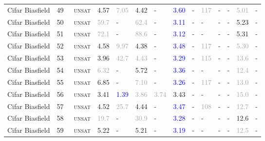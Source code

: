 \begin{center}
{\begin{longtable}{@{}llllllllllllll@{}}
Cifar Biasfield & 49 & ~\textsc{unsat} & \textcolor{second}{4.57} & \textcolor{darkgray}{7.05} & \textcolor{second}{4.42} & - & \textcolor{blue}{3.60} & - & \textcolor{darkgray}{117} & - & - & \textcolor{darkgray}{5.01} & - \\
Cifar Biasfield & 50 & ~\textsc{unsat} & \textcolor{darkgray}{59.7} & - & \textcolor{darkgray}{62.4} & - & \textcolor{blue}{3.11} & - & - & - & - & \textcolor{second}{5.23} & - \\
Cifar Biasfield & 51 & ~\textsc{unsat} & \textcolor{darkgray}{72.1} & - & \textcolor{darkgray}{88.6} & - & \textcolor{blue}{3.12} & - & - & - & - & \textcolor{second}{5.31} & - \\
Cifar Biasfield & 52 & ~\textsc{unsat} & \textcolor{second}{4.58} & \textcolor{darkgray}{9.97} & \textcolor{second}{4.38} & - & \textcolor{blue}{3.48} & - & \textcolor{darkgray}{117} & - & - & \textcolor{darkgray}{5.30} & - \\
Cifar Biasfield & 53 & ~\textsc{unsat} & \textcolor{second}{3.96} & \textcolor{darkgray}{42.7} & \textcolor{darkgray}{4.43} & - & \textcolor{blue}{3.29} & - & \textcolor{darkgray}{115} & - & - & \textcolor{darkgray}{13.6} & - \\
Cifar Biasfield & 54 & ~\textsc{unsat} & \textcolor{darkgray}{6.32} & - & \textcolor{second}{5.72} & - & \textcolor{blue}{3.36} & - & - & - & - & \textcolor{darkgray}{12.4} & - \\
Cifar Biasfield & 55 & ~\textsc{unsat} & \textcolor{second}{6.85} & - & \textcolor{darkgray}{7.10} & - & \textcolor{blue}{3.26} & - & \textcolor{darkgray}{117} & - & - & \textcolor{darkgray}{13.0} & - \\
Cifar Biasfield & 56 & ~\textsc{unsat} & \textcolor{second}{3.41} & \textcolor{blue}{1.39} & \textcolor{darkgray}{3.86} & \textcolor{darkgray}{3.74} & \textcolor{second}{3.43} & - & - & - & - & \textcolor{darkgray}{15.0} & - \\
Cifar Biasfield & 57 & ~\textsc{unsat} & \textcolor{second}{4.52} & \textcolor{darkgray}{25.7} & \textcolor{second}{4.44} & - & \textcolor{blue}{3.47} & - & \textcolor{darkgray}{108} & - & - & \textcolor{darkgray}{12.7} & - \\
Cifar Biasfield & 58 & ~\textsc{unsat} & \textcolor{darkgray}{19.7} & - & \textcolor{darkgray}{30.9} & - & \textcolor{blue}{3.28} & - & - & - & - & \textcolor{second}{12.6} & - \\
Cifar Biasfield & 59 & ~\textsc{unsat} & \textcolor{second}{5.22} & - & \textcolor{second}{5.21} & - & \textcolor{blue}{3.19} & - & - & - & - & \textcolor{darkgray}{12.5} & - \\

\end{longtable}}
\end{center}
